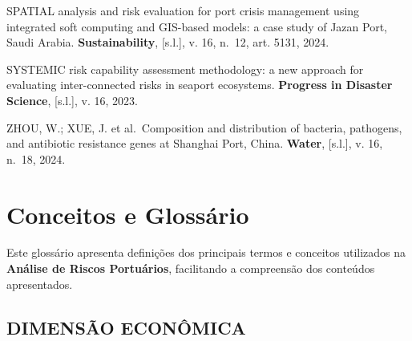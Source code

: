 \documentclass[
  portuguese,
  letterpaper,
  DIV=11,
  numbers=noendperiod]{scrreprt}
\begin{document}
SPATIAL analysis and risk evaluation for port crisis management using
integrated soft computing and GIS-based models: a case study of Jazan
Port, Saudi Arabia. \textbf{Sustainability}, {[}s.l.{]}, v. 16, n.~12,
art. 5131, 2024.

SYSTEMIC risk capability assessment methodology: a new approach for
evaluating inter-connected risks in seaport ecosystems. \textbf{Progress
in Disaster Science}, {[}s.l.{]}, v. 16, 2023.

ZHOU, W.; XUE, J. et al.~Composition and distribution of bacteria,
pathogens, and antibiotic resistance genes at Shanghai Port, China.
\textbf{Water}, {[}s.l.{]}, v. 16, n.~18, 2024.


\chapter{Conceitos e Glossário}\label{conceitos-e-glossuxe1rio}

Este glossário apresenta definições dos principais termos e conceitos
utilizados na \textbf{Análise de Riscos Portuários}, facilitando a
compreensão dos conteúdos apresentados.

\section{DIMENSÃO ECONÔMICA}\label{dimensuxe3o-econuxf4mica}
\end{document}
